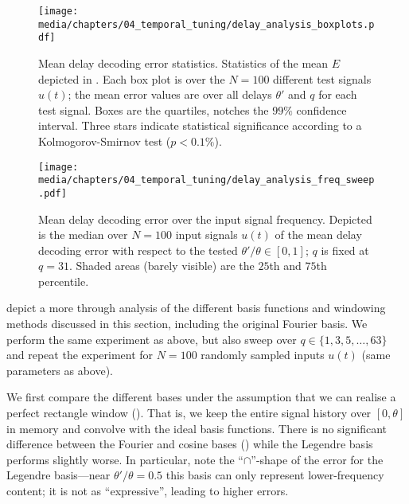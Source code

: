\begin{figure}[t]
	\centering
	\texttt{[image: media/chapters/04\_temporal\_tuning/delay\_analysis\_boxplots.pdf]}%
	{\label{fig:delay_analysis_boxplots_a}}%
	{\label{fig:delay_analysis_boxplots_b}}%
	{\label{fig:delay_analysis_boxplots_c}}%
	\caption[Mean delay decoding error statistics]{Mean delay decoding error statistics. Statistics of the mean \NRMSE $E$ depicted in . Each box plot is over the $N = 100$ different test signals $u(t)$; the mean error values are over all delays $\theta'$ and $q$ for each test signal.
	Boxes are the quartiles, notches the $99\%$ confidence interval.
	Three stars indicate statistical significance according to a Kolmogorov-Smirnov test ($p < 0.1\%$).
	}
	\label{fig:delay_analysis_boxplots}
	\vspace*{-0.25em}
\end{figure}

\begin{figure}[t]
	\centering
	\texttt{[image: media/chapters/04\_temporal\_tuning/delay\_analysis\_freq\_sweep.pdf]}%
	{\label{fig:delay_analysis_freq_sweep_a}}%
	{\label{fig:delay_analysis_freq_sweep_b}}%
	{\label{fig:delay_analysis_freq_sweep_c}}%
	\caption[Mean delay decoding error over the input signal frequency]{Mean delay decoding error over the input signal frequency.
	Depicted is the median over $N = 100$ input signals $u(t)$ of the mean delay decoding error with respect to the tested $\theta' / \theta \in [0, 1]$; $q$ is fixed at $q = 31$.
	Shaded areas (barely visible) are the $25$th and $75$th percentile.
	}
	\label{fig:delay_analysis_freq_sweep}
	\vspace*{-0.75em}
\end{figure}

 depict a more through analysis of the different basis functions and windowing methods discussed in this section, including the original Fourier basis.
We perform the same experiment as above, but also sweep over $q \in \{1, 3, 5, \ldots, 63\}$ and repeat the experiment for $N = 100$ randomly sampled inputs $u(t)$ (same parameters as above).

We first compare the different bases under the assumption that we can realise a perfect rectangle window ().
That is, we keep the entire signal history over $[0, \theta]$ in memory and convolve with the ideal basis functions.
There is no significant difference between the Fourier and cosine bases () while the Legendre basis performs slightly worse.
In particular, note the \enquote{$\cap$}-shape of the error for the Legendre basis---near $\theta' / \theta = 0.5$ this basis can only represent lower-frequency content; it is not as \enquote{expressive}, leading to higher errors.

